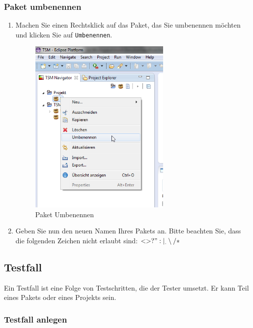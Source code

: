 \documentclass[11pt,a4paper,titlepage]{article}
\begin{document}
\subsubsection{Paket umbenennen}
\begin{enumerate}
\item Machen Sie einen Rechtsklick auf das Paket, das Sie umbenennen möchten und  klicken Sie auf \texttt{Umbenennen}.

\begin{figure}[H]
\centering
\includegraphics[width= 260px]{BilderHandbuchTSMNavigator/Paket/PaketUmbenennen.png}
\caption{Paket Umbenennen}
\label{fig:PaketUmbenennen}
\end{figure}

\item Geben Sie nun den neuen Namen Ihres Pakets an. Bitte beachten Sie, dass die folgenden Zeichen nicht erlaubt sind: $ < > ? " : | _ . \setminus / *$
\end{enumerate}


\subsection{Testfall}
Ein Testfall ist eine Folge von Testschritten, die der Tester umsetzt. Er kann Teil eines Pakets oder eines Projekts sein.
\subsubsection{Testfall anlegen}
\end{document}
